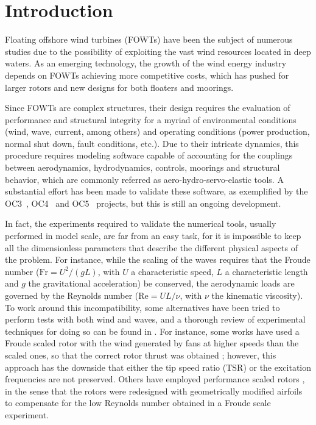 \section{Introduction} \label{sec:introduction}
Floating offshore wind turbines (FOWTs) have been the subject of numerous studies due to the possibility of exploiting the vast wind resources located in deep waters. As an emerging technology, the growth of the wind energy industry depends on FOWTs achieving more competitive costs, which has pushed for larger rotors and new designs for both floaters and moorings.

Since FOWTs are complex structures, their design requires the evaluation of performance and structural integrity for a myriad of environmental conditions (wind, wave, current, among others) and operating conditions (power production, normal shut down, fault conditions, etc.). Due to their intricate dynamics, this procedure requires modeling software capable of accounting for the couplings between aerodynamics, hydrodynamics, controls, moorings and structural behavior, which are commonly referred as aero-hydro-servo-elastic tools. A substantial effort has been made to validate these software, as exemplified by the OC3~\citep{jonkman2010report}, OC4~\citep{OC42014} and OC5~\citep{OC52017} projects, but this is still an ongoing development.

In fact, the experiments required to validate the numerical tools, usually performed in model scale, are far from an easy task, for it is impossible to keep all the dimensionless parameters that describe the different physical aspects of the problem. For instance, while the scaling of the waves requires that the Froude number ($\textrm{Fr} = U^{2}/(gL)$, with $U$ a characteristic speed, $L$ a characteristic length and $g$ the gravitational acceleration) be conserved, the aerodynamic loads are governed by the Reynolds number ($\textrm{Re} = UL/\nu$, with $\nu$ the kinematic viscosity). To work around this incompatibility, some alternatives have been tried to perform tests with both wind and waves, and a thorough review of experimental techniques for doing so can be found in \citet{otter2022review}. For instance, some works have used a Froude scaled rotor with  the wind generated by fans at higher speeds than the scaled ones, so that the correct rotor thrust was obtained \citep{martin2014methodology, skaare2007integrated, mortensen2018experimental}; however, this approach has the downside that either the tip speed ratio (TSR) or the excitation frequencies are not preserved. Others have employed performance scaled rotors \citep{goupee2014experimental, de2014development, bredmose2017triple}, in the sense that the rotors were redesigned with geometrically modified airfoils to compensate for the low Reynolds number obtained in a Froude scale experiment. 

